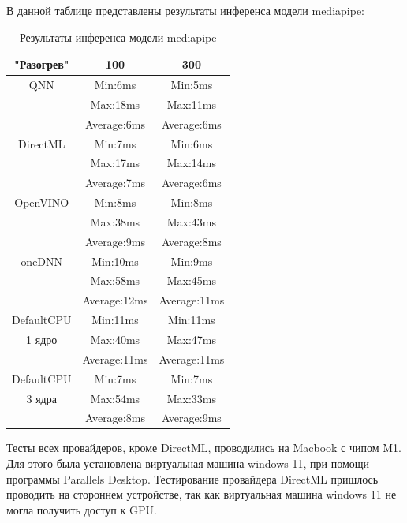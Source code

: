 \documentclass[a4paper,14pt]{extreport}
\begin{document}
        В данной таблице представлены результаты инференса модели mediapipe:
        \begin{table}[htbp]
            \centering
            \begin{tabular}{|c|c|c|}
                \hline
                \textbf{"Разогрев"} & \textbf{100} & \textbf{300} \\
                \hline
                QNN & Min:6ms & Min:5ms\\
                    & Max:18ms & Max:11ms\\
                    & Average:6ms & Average:6ms\\
                \hline
                DirectML & Min:7ms & Min:6ms\\
                         & Max:17ms & Max:14ms\\
                         & Average:7ms & Average:6ms\\
                \hline
                OpenVINO & Min:8ms & Min:8ms\\
                         & Max:38ms & Max:43ms\\
                         & Average:9ms & Average:8ms\\
                \hline
                oneDNN & Min:10ms & Min:9ms\\
                       & Max:58ms & Max:45ms\\
                       & Average:12ms & Average:11ms\\
                \hline
                DefaultCPU & Min:11ms & Min:11ms\\
                1 ядро     & Max:40ms & Max:47ms\\
                           & Average:11ms & Average:11ms\\
                \hline
                DefaultCPU & Min:7ms & Min:7ms\\
                3 ядра     & Max:54ms & Max:33ms\\
                           & Average:8ms & Average:9ms\\
                \hline
            \end{tabular}
            \caption{Результаты инференса модели mediapipe}
            \label{tab:exampleQNN}
        \end{table}

        Тесты всех провайдеров, кроме DirectML, проводились на Macbook с чипом M1. Для этого была установлена виртуальная машина windows 11, при помощи программы Parallels Desktop. Тестирование провайдера DirectML пришлось проводить на стороннем устройстве, так как виртуальная машина windows 11 не могла получить доступ к GPU.
\end{document}

